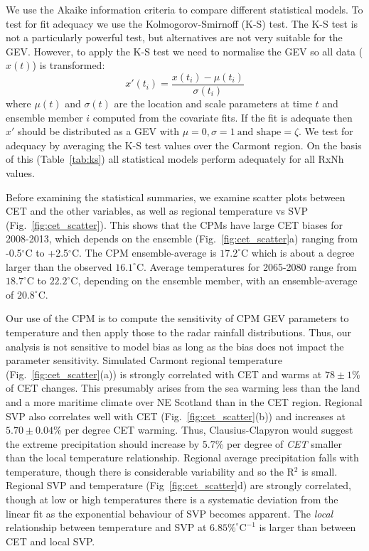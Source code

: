 \documentclass[11pt,a4paper]{article}
\begin{document}
 We  use the Akaike information criteria\parencite{akaike74aic} to compare different statistical models. To test for fit adequacy we use the  Kolmogorov-Smirnoff (K-S) test. The K-S test is not a particularly powerful test\parencite{stephens74fit}, but alternatives are not very suitable for the GEV. However, to apply the K-S test we need to normalise the GEV so all data ($x(t)$) is transformed:
\begin{equation}
	x'(t_i)=\frac{x(t_i)-\mu(t_i)}{\sigma(t_i)}
\end{equation}
where $\mu(t)$ and $\sigma(t)$ are the location and scale parameters at time $t$ and ensemble member $i$ computed from the covariate fits. 
If the fit is adequate then $x'$ should be distributed as a GEV with $\mu=0, \sigma=1\ \text{and shape}=\zeta$. We test for adequacy by averaging the K-S test values over the Carmont region. On the basis of this (Table~\ref{tab:ks}) all statistical models perform adequately for all RxNh values.  


Before examining  the statistical summaries, we examine scatter plots between CET and the other variables, as well as regional temperature vs SVP (Fig.~\ref{fig:cet_scatter}). This shows that the CPMs have large CET biases for 2008-2013, which depends on the ensemble (Fig.~\ref{fig:cet_scatter}a) ranging from -0.5$^\circ$C to +2.5$^\circ$C. The CPM ensemble-average  is $17.2^\circ$C which is about a degree larger than the observed $16.1^\circ$C. Average temperatures for 2065-2080 range from $18.7^\circ$C to $22.2^\circ$C, depending on the ensemble member,  with an ensemble-average of  $20.8^\circ$C.

Our use of the CPM is to compute the sensitivity of CPM GEV parameters to temperature and then apply those to the radar rainfall distributions. Thus, our analysis is not sensitive to model bias as long as the bias does not impact the parameter sensitivity.  Simulated Carmont regional temperature (Fig.~\ref{fig:cet_scatter}(a)) is strongly correlated with CET and warms at $78\pm1$\% of CET changes. This presumably arises from the sea warming less than the land and a more maritime climate over NE Scotland than in the CET region. Regional SVP also correlates well with CET (Fig.~\ref{fig:cet_scatter}(b)) and increases at $5.70\pm 0.04$\% per degree CET warming. Thus, Clausius-Clapyron would suggest the extreme precipitation should increase by 5.7\% per degree of \textit{CET} smaller than the local temperature relationship. Regional  average precipitation falls with temperature, though there is considerable variability and so the R$^2$ is small.  Regional SVP and temperature (Fig~\ref{fig:cet_scatter}d) are strongly correlated, though at low or high temperatures there is a systematic deviation from the linear fit as the exponential behaviour of SVP becomes apparent. The \textit{local} relationship between temperature and SVP at $6.85\%^\circ\text{C}^{-1}$ is larger than between CET and local SVP.  
 
\end{document}

